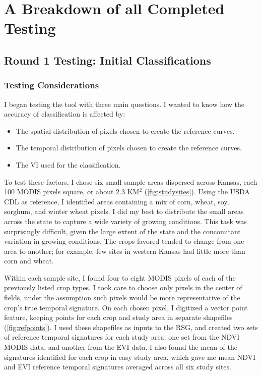 \chapter{A Breakdown of all Completed Testing}
\label{appendix:testing}

\section{Round 1 Testing: Initial Classifications}
\subsection*{Testing Considerations}

I began testing the tool with three main questions. I wanted to know how the accuracy of classification is affected by:

\begin{Spacing}{1.2}
\begin{itemize}
  \item The spatial distribution of pixels chosen to create the reference curves.
  \item The temporal distribution of pixels chosen to create the reference curves.
  \item The VI used for the classification.
\end{itemize}
\end{Spacing}

To test these factors, I chose six small sample areas dispersed across Kansas, each 100 MODIS pixels square, or about 2.3 KM$^2$ (\autoref{fig:studysites}). Using the USDA CDL as reference, I identified areas containing a mix of corn, wheat, soy, sorghum, and winter wheat pixels. I did my best to distribute the small areas across the state to capture a wide variety of growing conditions. This task was surprisingly difficult, given the large extent of the state and the concomitant variation in growing conditions. The crops favored tended to change from one area to another; for example, few sites in western Kansas had little more than corn and wheat.

Within each sample site, I found four to eight MODIS pixels of each of the previously listed crop types. I took care to choose only pixels in the center of fields, under the assumption such pixels would be more representative of the crop’s true temporal signature. On each chosen pixel, I digitized a vector point feature, keeping points for each crop and study area in separate shapefiles  (\autoref{fig:refpoints}). I used these shapefiles as inputs to the RSG, and created two sets of reference temporal signatures for each study area: one set from the NDVI MODIS data, and another from the EVI data. I also found the mean of the signatures identified for each crop in easy study area, which gave me mean NDVI and EVI reference temporal signatures averaged across all six study sites.

